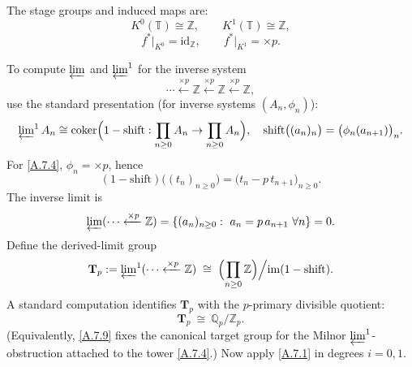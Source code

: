 \documentclass[11pt]{article}
\theoremstyle{remark}
\begin{document}
The stage groups and induced maps are:
\begin{equation}
K^{0}(\mathbb T)\cong \mathbb Z,\qquad K^{1}(\mathbb T)\cong \mathbb Z,
\label{A.7.2}
\end{equation}
\begin{equation}
f^{*}\big|_{K^{0}}=\mathrm{id}_{\mathbb Z},\qquad f^{*}\big|_{K^{1}}=\times p.
\label{A.7.3}
\end{equation}

To compute $\varprojlim$ and $\varprojlim^{1}$ for the inverse system
\begin{equation}
\cdots \xleftarrow{\times p}\mathbb Z \xleftarrow{\times p}\mathbb Z \xleftarrow{\times p}\mathbb Z,
\label{A.7.4}
\end{equation}
use the standard presentation (for inverse systems $(A_{n},\phi_{n})$):
\begin{equation}
\varprojlim\nolimits^{1}A_{n}\cong\mathrm{coker}\Bigl(1-\mathrm{shift}:\prod_{n\ge 0}A_{n}\to\prod_{n\ge 0}A_{n}\Bigr),
\quad
\mathrm{shift}\bigl((a_{n})_{n}\bigr)=\bigl(\phi_{n}(a_{n+1})\bigr)_{n}.
\label{A.7.5}
\end{equation}
For \eqref{A.7.4}, $\phi_{n}=\times p$, hence
\begin{equation}
(1-\mathrm{shift})\bigl((t_{n})_{n\ge 0}\bigr)=\bigl(t_{n}-p\,t_{n+1}\bigr)_{n\ge 0}.
\label{A.7.6}
\end{equation}
The inverse limit is
\begin{equation}
\varprojlim(\cdots \xleftarrow{\times p}\mathbb Z)
=
\{(a_{n})_{n\ge 0}:\ a_{n}=p\,a_{n+1}\ \forall n\}
=
0.
\label{A.7.7}
\end{equation}
Define the derived-limit group
\begin{equation}
\mathbf{T}_{p}:=\varprojlim\nolimits^{1}(\cdots \xleftarrow{\times p}\mathbb Z)
\;\cong\;
\Bigl(\prod_{n\ge 0}\mathbb Z\Bigr)\Big/\mathrm{im}(1-\mathrm{shift}).
\label{A.7.8}
\end{equation}
A standard computation identifies $\mathbf{T}_{p}$ with the $p$-primary divisible quotient:
\begin{equation}
\mathbf{T}_{p}\ \cong\ \mathbb Q_{p}/\mathbb Z_{p}.
\label{A.7.9}
\end{equation}
(Equivalently, \eqref{A.7.9} fixes the canonical target group for the Milnor $\varprojlim^{1}$-obstruction attached to the tower \eqref{A.7.4}.)
Now apply \eqref{A.7.1} in degrees $i=0,1$.
\end{document}
